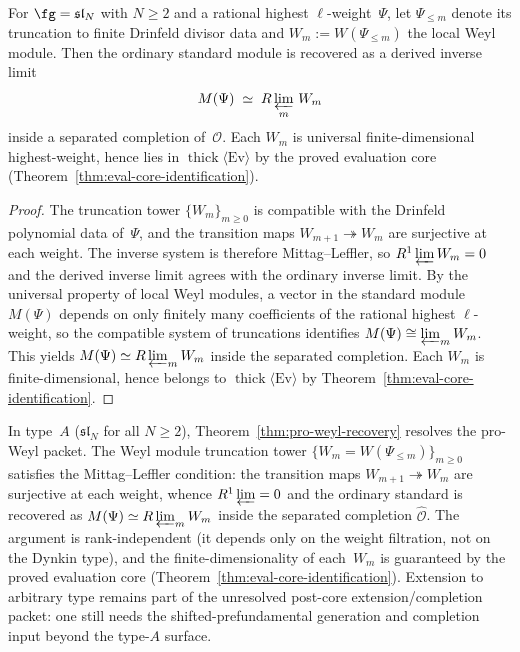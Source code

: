 \begin{theorem}
\label{thm:pro-weyl-recovery}
For $\fg = \mathfrak{sl}_N$ with $N \ge 2$ and a rational highest
$\ell$-weight~$\Psi$, let
$\Psi_{\leq m}$ denote its truncation to finite Drinfeld divisor
data and $W_m := W(\Psi_{\leq m})$ the local Weyl module.
Then the ordinary standard module is recovered as a derived
inverse limit
\[
M(\Psi) \;\simeq\; R\varprojlim_m\, W_m
\]
inside a separated completion of~$\mathcal{O}$.
Each $W_m$ is universal finite-dimensional highest-weight, hence lies
in $\operatorname{thick}\langle \mathrm{Ev} \rangle$ by the proved
evaluation core (Theorem~\ref{thm:eval-core-identification}).
\end{theorem}

\begin{proof}
The truncation tower $\{W_m\}_{m \geq 0}$ is compatible with the
Drinfeld polynomial data of~$\Psi$, and the transition maps
$W_{m+1} \twoheadrightarrow W_m$ are surjective at each weight. The
inverse system is therefore Mittag--Leffler, so
$R^1\varprojlim W_m = 0$ and the derived inverse limit agrees with the
ordinary inverse limit. By the universal property of local Weyl
modules, a vector in the standard module $M(\Psi)$ depends on only
finitely many coefficients of the rational highest $\ell$-weight, so
the compatible system of truncations identifies
$M(\Psi) \cong \varprojlim_m W_m$. This yields
$M(\Psi) \simeq R\varprojlim_m W_m$ inside the separated completion.
Each $W_m$ is finite-dimensional, hence belongs to
$\operatorname{thick}\langle \mathrm{Ev} \rangle$ by
Theorem~\ref{thm:eval-core-identification}.
\end{proof}

\begin{remark}
\label{rem:pro-weyl-recovery-typeA}
In type~$A$ ($\mathfrak{sl}_N$ for all $N \geq 2$),
Theorem~\ref{thm:pro-weyl-recovery} resolves the pro-Weyl packet.
The Weyl module truncation tower
$\{W_m = W(\Psi_{\leq m})\}_{m \geq 0}$ satisfies the
Mittag--Leffler condition: the transition maps
$W_{m+1} \twoheadrightarrow W_m$ are surjective at each weight,
whence $R^1\varprojlim = 0$ and the ordinary standard is recovered as
$M(\Psi) \simeq R\varprojlim_m W_m$ inside the separated completion
$\widehat{\mathcal{O}}$.
The argument is rank-independent (it depends only on the weight
filtration, not on the Dynkin type), and the finite-dimensionality of
each~$W_m$ is guaranteed by the proved evaluation core
(Theorem~\ref{thm:eval-core-identification}).
Extension to arbitrary type remains part of the unresolved
post-core extension/completion packet: one still needs the
shifted-prefundamental generation and completion input beyond the
type-$A$ surface.
\end{remark}

